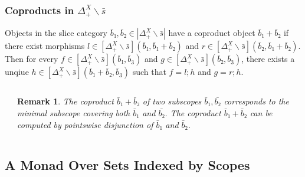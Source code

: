 \documentclass[aspectratio=169]{beamer}
\theoremstyle{remarkstyle}
\newtheorem*{remark}{Remark}
\begin{document}
\begin{frame}[fragile]
  \frametitle{Coproducts in $Δ_+^X∖\bar{s}$}
  \begin{theorem}
    Objects in the slice category $\bar{b}₁, \bar{b}₂ ∈ |Δ_+^X∖\bar{s}|$ have a coproduct object $\bar{b}₁ + \bar{b}₂$ if there exist morphisms $l ∈ [Δ_+^X∖\bar{s}](\bar{b}₁, \bar{b}₁ + \bar{b}₂)$ and $r ∈ [Δ_+^X∖\bar{s}](\bar{b}₂, \bar{b}₁ + \bar{b}₂)$. Then for every $f ∈ [Δ_+^X∖\bar{s}](\bar{b}₁, \bar{b}_3)$ and $g ∈ [Δ_+^X∖\bar{s}](\bar{b}₂, \bar{b}_3)$, there exists a unqiue $h ∈ [Δ_+^X∖\bar{s}](\bar{b}₁ + \bar{b}₂, \bar{b}_3)$ such that $f = l;h$ and $g = r;h$.
  \end{theorem}
  \begin{columns}
    \begin{column}{0.5\textwidth}
      \begin{example}
      \end{example}
    \end{column}
    \begin{column}{0.46\textwidth}
      \begin{remark}
        The coproduct $\bar{b}₁ + \bar{b}₂$ of two subscopes $\bar{b}₁, \bar{b₂}$ 
        corresponds to the minimal subscope covering both $\bar{b}₁$ and $\bar{b₂}$. 
        The coproduct $\bar{b}₁ + \bar{b}₂$ can be computed by pointswise disjunction of $\bar{b}₁$ and $\bar{b}₂$. 
      \end{remark}
    \end{column}
  \end{columns}
\end{frame}

\subsection{A Monad Over Sets Indexed by Scopes}
\end{document}
